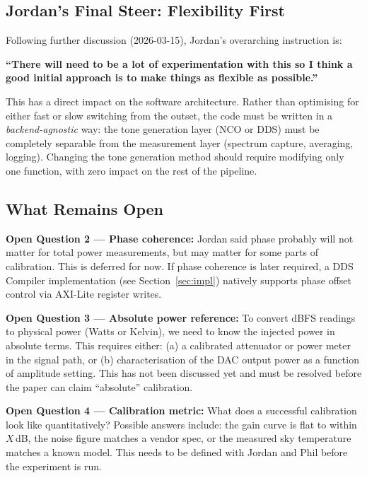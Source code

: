 \documentclass[11pt,a4paper]{article}
\newenvironment{infobox}{\begin{tcolorbox}[enhanced,colback=infobg,colframe=xilinxblue,
  left=5pt,right=5pt,top=3pt,bottom=3pt,before upper={\small}]}{\end{tcolorbox}}
\newenvironment{todobox}{\begin{tcolorbox}[enhanced,colback=warnbg,colframe=rhinored,
  left=5pt,right=5pt,top=3pt,bottom=3pt,
  before upper={\small\textbf{\color{rhinored}TODO / OPEN QUESTION:\enspace}}]}{\end{tcolorbox}}
\begin{document}
\subsection{Jordan's Final Steer: Flexibility First}

Following further discussion (2026-03-15), Jordan's overarching instruction is:

\begin{infobox}
\textbf{``There will need to be a lot of experimentation with this so I think a good
initial approach is to make things as flexible as possible.''}
\end{infobox}

This has a direct impact on the software architecture. Rather than optimising for
either fast or slow switching from the outset, the code must be written in a
\textit{backend-agnostic} way: the tone generation layer (NCO or DDS) must be
completely separable from the measurement layer (spectrum capture, averaging,
logging). Changing the tone generation method should require modifying only one
function, with zero impact on the rest of the pipeline.

\subsection{What Remains Open}

\begin{todobox}
\textbf{Open Question 2 --- Phase coherence:} Jordan said phase probably will not
matter for total power measurements, but may matter for some parts of calibration.
This is deferred for now. If phase coherence is later required, a DDS Compiler
implementation (see Section~\ref{sec:impl}) natively supports phase offset control
via AXI-Lite register writes.
\end{todobox}

\begin{todobox}
\textbf{Open Question 3 --- Absolute power reference:} To convert dBFS readings to
physical power (Watts or Kelvin), we need to know the injected power in absolute
terms. This requires either: (a) a calibrated attenuator or power meter in the
signal path, or (b) characterisation of the DAC output power as a function of
amplitude setting. This has not been discussed yet and must be resolved before the
paper can claim ``absolute'' calibration.
\end{todobox}

\begin{todobox}
\textbf{Open Question 4 --- Calibration metric:} What does a successful calibration
look like quantitatively? Possible answers include: the gain curve is flat to within
$X$\,dB, the noise figure matches a vendor spec, or the measured sky temperature
matches a known model. This needs to be defined with Jordan and Phil before the
experiment is run.
\end{todobox}
\end{document}
